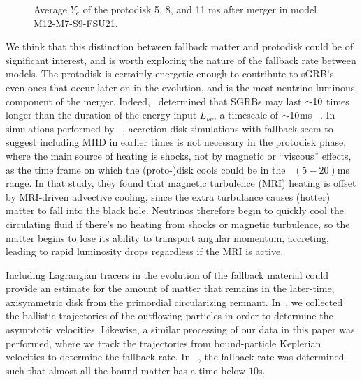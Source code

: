 \begin{figure}
	\centering
	
	\caption[Average temperature of the protodisks 5, 8, and 11 ms after merger]{
		Average $Y_e$ of the protodisk 5, 8, and 11 ms after merger in model M12-M7-S9-FSU21.
	}
	\label{fig:longdiskcompositions}
\end{figure}

We think that this distinction between fallback matter and protodisk could be of significant interest, and is worth exploring the nature of the fallback rate between models.
The protodisk is certainly energetic enough to contribute to sGRB's, even ones that occur later on in the evolution, and is the most neutrino luminous component of the merger.
Indeed,~\cite{Aloy:2004nh} determined that SGRBs may last $\mathord{\sim}10$ times longer than the duration of the energy input $L_{\nu \bar{\nu}}$, a timescale of $\mathord{\sim} 10$ms ~\cite{shibata2006magnetized}.
In simulations performed by ~\cite{noori2016dissertation}, accretion disk simulations with fallback seem to suggest including MHD in earlier times is not necessary in the protodisk phase, where the main source of heating is shocks, not by magnetic or ``viscous'' effects, as the time frame on which the (proto-)disk cools could be in the ~$(5-20)$ms range.
In that study, they found that magnetic turbulence (MRI) heating is offset by MRI-driven advective cooling, since the extra turbulance causes (hotter) matter to fall into the black hole.
Neutrinos therefore begin to quickly cool the circulating fluid if there's no heating from shocks or magnetic turbulence, so the matter begins to lose its ability to transport angular momentum, accreting, leading to rapid luminosity drops regardless if the MRI is active.

Including Lagrangian tracers in the evolution of the fallback material could provide an estimate for the amount of matter that remains in the later-time, axisymmetric disk from the primordial circularizing remnant.
In~\cite{FoucartDD2:2017}, we collected the ballistic trajectories of the outflowing particles in order to determine the asymptotic velocities.
Likewise, a similar processing of our data in this paper was performed, where we track the trajectories from bound-particle Keplerian velocities to determine the fallback rate.  In ~\cite{Chawla:2010sw}, the fallback rate was determined such that almost all the bound matter has a time below $10$s. 

